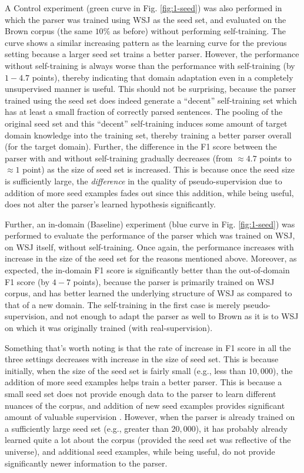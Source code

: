 \documentclass{sig-alternate-05-2015}
\begin{document}
A Control experiment (green curve in Fig. \ref{fig:1-seed}) was also performed in which the parser was trained using WSJ as the seed set, and evaluated on the Brown corpus (the same $10\%$ as before) without performing self-training. The curve shows a similar increasing pattern as the learning curve for the previous setting because a larger seed set trains a better parser. However, the performance without self-training is always worse than the performance with self-training (by $1-4.7$ points), thereby indicating that domain adaptation even in a completely unsupervised manner is useful. This should not be surprising, because the parser trained using the seed set does indeed generate a ``decent'' self-training set which has at least a small fraction of correctly parsed sentences. The pooling of the original seed set and this ``decent'' self-training induces some amount of target domain knowledge into the training set, thereby training a better parser overall (for the target domain). Further, the difference in the F1 score between the parser with and without self-training gradually decreases (from $\approx4.7$ points to $\approx1$ point) as the size of seed set is increased. This is because once the seed size is sufficiently large, the \emph{difference} in the quality of pseudo-supervision due to addition of more seed examples fades out since this addition, while being useful, does not alter the parser's learned hypothesis significantly.

Further, an in-domain (Baseline) experiment (blue curve in Fig. \ref{fig:1-seed}) was performed to evaluate the performance of the parser which was trained on WSJ, on WSJ itself, without self-training. Once again, the performance increases with increase in the size of the seed set for the reasons mentioned above. Moreover, as expected, the in-domain F1 score is significantly better than the out-of-domain F1 score (by $4-7$ points), because the parser is primarily trained on WSJ corpus, and has better learned the underlying structure of WSJ as compared to that of a new domain. The self-training in the first case is merely pseudo-supervision, and not enough to adapt the parser as well to Brown as it is to WSJ on which it was originally trained (with real-supervision).

Something that's worth noting is that the rate of increase in F1 score in all the three settings decreases with increase in the size of seed set. This is because initially, when the size of the seed set is fairly small (e.g., less than $10,000$), the addition of more seed examples helps train a better parser. This is because a small seed set does not provide enough data to the parser to learn different nuances of the corpus, and addition of new seed examples provides significant amount of valuable supervision . However, when the parser is already trained on a sufficiently large seed set (e.g., greater than $20,000$), it has probably already learned quite a lot about the corpus (provided the seed set was reflective of the universe), and additional seed examples, while being useful, do not provide significantly newer information to the parser.
\end{document}

